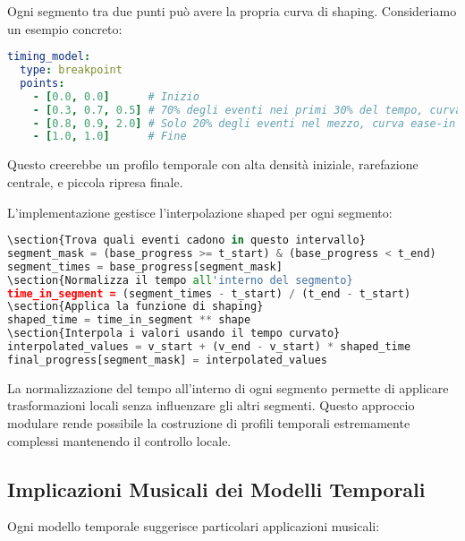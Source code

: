 Ogni segmento tra due punti può avere la propria curva di shaping. Consideriamo un esempio concreto:

\begin{lstlisting}[language=Yaml]
timing_model:
  type: breakpoint
  points:
    - [0.0, 0.0]      # Inizio
    - [0.3, 0.7, 0.5] # 70% degli eventi nei primi 30% del tempo, curva ease-out
    - [0.8, 0.9, 2.0] # Solo 20% degli eventi nel mezzo, curva ease-in
    - [1.0, 1.0]      # Fine
\end{lstlisting}

Questo creerebbe un profilo temporale con alta densità iniziale, rarefazione centrale, e piccola ripresa finale.

L'implementazione gestisce l'interpolazione shaped per ogni segmento:

\begin{lstlisting}[language=Python]
\section{Trova quali eventi cadono in questo intervallo}
segment_mask = (base_progress >= t_start) & (base_progress < t_end)
segment_times = base_progress[segment_mask]
\section{Normalizza il tempo all'interno del segmento}
time_in_segment = (segment_times - t_start) / (t_end - t_start)
\section{Applica la funzione di shaping}
shaped_time = time_in_segment ** shape
\section{Interpola i valori usando il tempo curvato}
interpolated_values = v_start + (v_end - v_start) * shaped_time
final_progress[segment_mask] = interpolated_values
\end{lstlisting}

La normalizzazione del tempo all'interno di ogni segmento permette di applicare trasformazioni locali senza influenzare gli altri segmenti. Questo approccio modulare rende possibile la costruzione di profili temporali estremamente complessi mantenendo il controllo locale.
\subsection{Implicazioni Musicali dei Modelli Temporali}
Ogni modello temporale suggerisce particolari applicazioni musicali:

